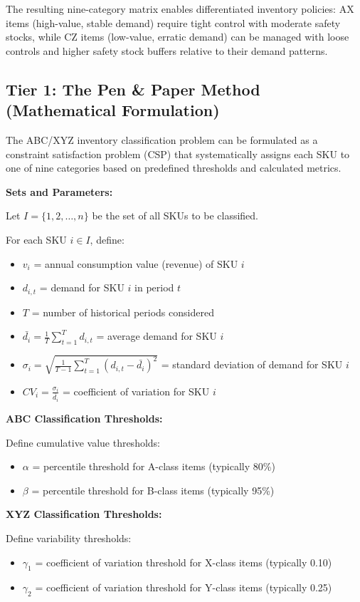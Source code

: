 \documentclass{article}
\begin{document}
The resulting nine-category matrix enables differentiated inventory policies: AX items (high-value, stable demand) require tight control with moderate safety stocks, while CZ items (low-value, erratic demand) can be managed with loose controls and higher safety stock buffers relative to their demand patterns.

\subsection{Tier 1: The Pen \& Paper Method (Mathematical Formulation)}

The ABC/XYZ inventory classification problem can be formulated as a constraint satisfaction problem (CSP) that systematically assigns each SKU to one of nine categories based on predefined thresholds and calculated metrics.

\textbf{Sets and Parameters:}

Let $I = \{1, 2, \ldots, n\}$ be the set of all SKUs to be classified.

For each SKU $i \in I$, define:
\begin{itemize}
    \item $v_i$ = annual consumption value (revenue) of SKU $i$
    \item $d_{i,t}$ = demand for SKU $i$ in period $t$
    \item $T$ = number of historical periods considered
    \item $\bar{d_i} = \frac{1}{T} \sum_{t=1}^{T} d_{i,t}$ = average demand for SKU $i$
    \item $\sigma_i = \sqrt{\frac{1}{T-1} \sum_{t=1}^{T} (d_{i,t} - \bar{d_i})^2}$ = standard deviation of demand for SKU $i$
    \item $CV_i = \frac{\sigma_i}{\bar{d_i}}$ = coefficient of variation for SKU $i$
\end{itemize}

\textbf{ABC Classification Thresholds:}

Define cumulative value thresholds:
\begin{itemize}
    \item $\alpha$ = percentile threshold for A-class items (typically 80\%)
    \item $\beta$ = percentile threshold for B-class items (typically 95\%)
\end{itemize}

\textbf{XYZ Classification Thresholds:}

Define variability thresholds:
\begin{itemize}
    \item $\gamma_1$ = coefficient of variation threshold for X-class items (typically 0.10)
    \item $\gamma_2$ = coefficient of variation threshold for Y-class items (typically 0.25)
\end{itemize}
\end{document}
